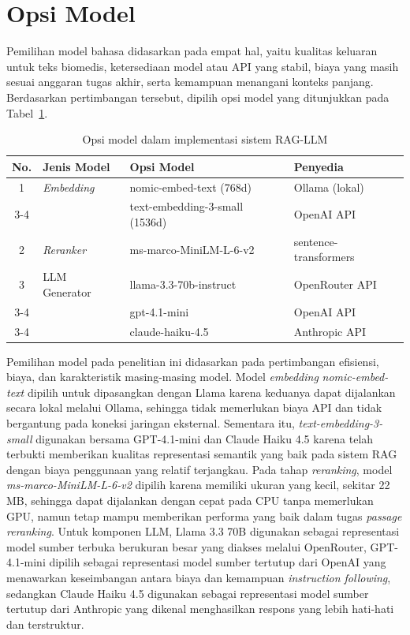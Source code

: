 \section{Opsi Model}
\label{sec:opsi-model}

Pemilihan model bahasa didasarkan pada empat hal, yaitu kualitas keluaran untuk teks biomedis, ketersediaan model atau API yang stabil, biaya yang masih sesuai anggaran tugas akhir, serta kemampuan menangani konteks panjang. Berdasarkan pertimbangan tersebut, dipilih opsi model yang ditunjukkan pada Tabel~\ref{tbl:opsi-model}.

\begin{table}[H]
\centering
\caption{Opsi model dalam implementasi sistem RAG-LLM}
\label{tbl:opsi-model}
\begin{tabularx}{\textwidth}{|c|p{2.5cm}|>{\raggedright\arraybackslash}X|p{4cm}|}
\hline
\textbf{No.} & \textbf{Jenis Model} & \textbf{Opsi Model} & \textbf{Penyedia} \\ \hline
1 & \textit{Embedding} & nomic-embed-text (768d) & Ollama (lokal) \\ \cline{3-4}
  &                    & text-embedding-3-small (1536d) & OpenAI API \\ \hline
2 & \textit{Reranker}  & ms-marco-MiniLM-L-6-v2 & sentence-transformers \\ \hline
3 & LLM Generator      & llama-3.3-70b-instruct & OpenRouter API \\ \cline{3-4}
  &                    & gpt-4.1-mini & OpenAI API \\ \cline{3-4}
  &                    & claude-haiku-4.5 & Anthropic API \\ \hline
\end{tabularx}
\end{table}

Pemilihan model pada penelitian ini didasarkan pada pertimbangan efisiensi, biaya, dan karakteristik masing-masing model. Model \textit{embedding} \textit{nomic-embed-text} dipilih untuk dipasangkan dengan Llama karena keduanya dapat dijalankan secara lokal melalui Ollama, sehingga tidak memerlukan biaya API dan tidak bergantung pada koneksi jaringan eksternal. Sementara itu, \textit{text-embedding-3-small} digunakan bersama GPT-4.1-mini dan Claude Haiku 4.5 karena telah terbukti memberikan kualitas representasi semantik yang baik pada sistem RAG dengan biaya penggunaan yang relatif terjangkau. Pada tahap \textit{reranking}, model \textit{ms-marco-MiniLM-L-6-v2} dipilih karena memiliki ukuran yang kecil, sekitar 22 MB, sehingga dapat dijalankan dengan cepat pada CPU tanpa memerlukan GPU, namun tetap mampu memberikan performa yang baik dalam tugas \textit{passage reranking}. Untuk komponen LLM, Llama 3.3 70B digunakan sebagai representasi model sumber terbuka berukuran besar yang diakses melalui OpenRouter, GPT-4.1-mini dipilih sebagai representasi model sumber tertutup dari OpenAI yang menawarkan keseimbangan antara biaya dan kemampuan \textit{instruction following}, sedangkan Claude Haiku 4.5 digunakan sebagai representasi model sumber tertutup dari Anthropic yang dikenal menghasilkan respons yang lebih hati-hati dan terstruktur.

